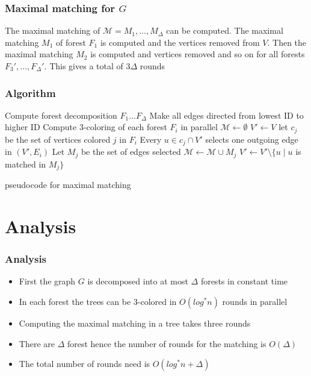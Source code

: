 \documentclass{beamer}
\begin{document}

\begin{frame}
\frametitle{Maximal matching for $G$}
The maximal matching of $\mathcal{M} = M_1,\dots, M_\Delta$ can be computed. The
maximal matching $M_1$ of forest $F_1$ is computed and the vertices removed from $V$. Then the
maximal matching $M_2$ is computed and vertices removed and so on for all forests $F_3',\dots ,
F_\Delta'$. This gives a total of 3$\Delta$ rounds

\end{frame}



\begin{frame}
\frametitle{Algorithm}

\begin{algorithm}[H]
\begin{algorithmic}[1]
 {\footnotesize \STATE Compute forest decomposition $F_1 \dots F_\Delta$ 
 \STATE Make all edges directed from lowest ID to higher ID 
 \STATE Compute 3-coloring of each forest $F_i$ in parallel
 \STATE $\mathcal{M}\leftarrow \emptyset$
 \STATE $V' \leftarrow V$ 
 \STATE let $c_j$ be the set of vertices colored $j$ in $F_i$
 \STATE Every $u \in c_j \cap V'$ selects one outgoing edge in $(V',E_i)$
 \STATE Let $M_j$ be the set of edges selected
 \STATE $\mathcal{M} \leftarrow \mathcal{M} \cup M_j$
 \STATE $V' \leftarrow V'\setminus \{u \mid u$ is matched in $M_j\}$ 
\ENDFOR
\ENDFOR }
\end{algorithmic}
\caption{pseudocode for maximal matching}
\end{algorithm}
\end{frame}

\section{Analysis}
\begin{frame}
\frametitle{Analysis}
\begin{itemize}
 \item First the graph $G$ is decomposed into at most $\Delta$ forests in constant time
\item In each forest the trees can be 3-colored in $O(log^* n)$ rounds in parallel
\item Computing the maximal matching in a tree takes three rounds
\item There are $\Delta$ forest hence the number of rounds for the matching is $O(\Delta)$
\item The total number of rounds need is $O(log^* n + \Delta)$
\end{itemize}
\end{frame}
\end{document}
